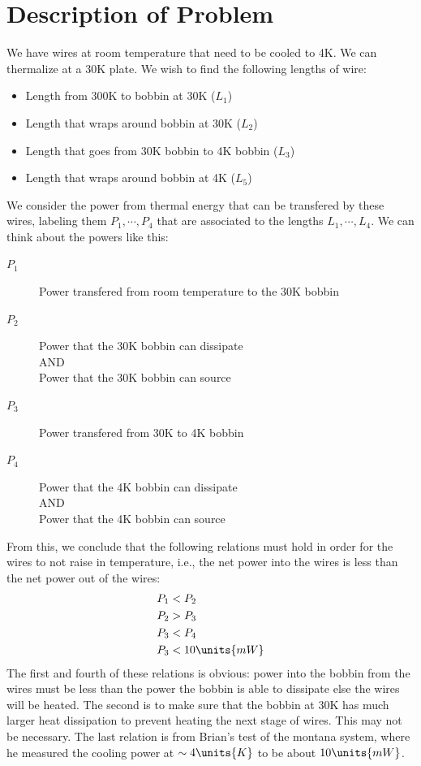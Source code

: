 \documentclass[10pt,twocolumn,aps,rmp,tightenlines,reprint]{revtex4-1}
\begin{document}
\section{Description of Problem}
We have wires at room temperature that need to be cooled to 4K.  We can 
thermalize at a 30K plate.  We wish to find the following lengths of wire:

\begin{itemize}
    \item Length from 300K to bobbin at 30K (\(L_1\))
    \item Length that wraps around bobbin at 30K (\(L_2\))
    \item Length that goes from 30K bobbin to 4K bobbin (\(L_3\))
    \item Length that wraps around bobbin at 4K (\(L_5\))
\end{itemize}

We consider the power from thermal energy that can be transfered by these 
wires, labeling them \(P_1,\cdots,P_4\) that are associated to the lengths 
\(L_1,\cdots,L_4\).  We can think about the powers like this:
\begin{description}
    \item[\(P_1\)] Power transfered from room temperature to the 30K bobbin
    \item[\(P_2\)] Power that the 30K bobbin can dissipate \\ AND \\ 
                   Power that the 30K bobbin can source
    \item[\(P_3\)] Power transfered from 30K to 4K bobbin
    \item[\(P_4\)] Power that the 4K bobbin can dissipate \\ AND \\
                   Power that the 4K bobbin can source
\end{description}
From this, we conclude that the following relations must hold in 
order for the wires to not raise in temperature, i.e., the net power into 
the wires is less than the net power out of the wires:
\begin{align*}
    P_1 &< P_2\\
    P_2 &> P_3\\
    P_3 &< P_4\\
    P_3 &< 10 \units{mW}
\end{align*}
The first and fourth of these relations is obvious: power into the bobbin 
from the wires must be less than the power the bobbin is able to dissipate 
else the wires will be heated.  The second is to make sure that the bobbin 
at 30K has much larger heat dissipation to prevent heating the next 
stage of wires.  This may not be necessary.  The last relation is from 
Brian's test of the montana system, where he measured the cooling power at
\(\sim 4\units{K}\) to be about \(10 \units{mW}\).  
\end{document}
